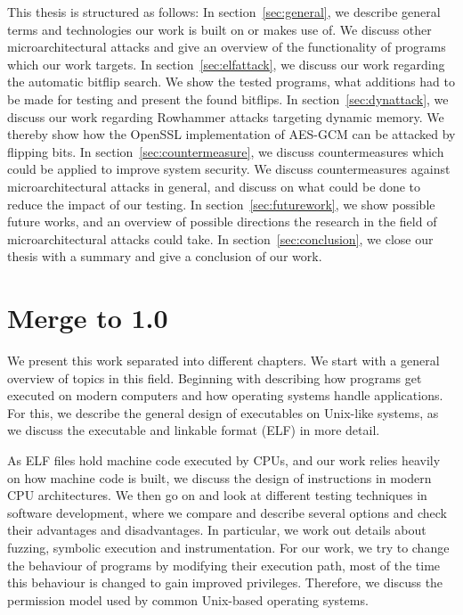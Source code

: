 This thesis is structured as follows: In section~\ref{sec:general}, we describe
general terms and technologies our work is built on or makes use of. We discuss
other microarchitectural attacks and give an overview of the functionality of
programs which our work targets. In section~\ref{sec:elfattack}, we discuss our
work regarding the automatic bitflip search. We show the tested programs, what
additions had to be made for testing and present the found bitflips. In
section~\ref{sec:dynattack}, we discuss our work regarding Rowhammer attacks
targeting dynamic memory. We thereby show how the OpenSSL implementation of
AES-GCM can be attacked by flipping bits. In section~\ref{sec:countermeasure},
we discuss countermeasures which could be applied to improve system security. We
discuss countermeasures against microarchitectural attacks in general, and
discuss on what could be done to reduce the impact of our testing. In
section~\ref{sec:futurework}, we show possible future works, and an overview of
possible directions the research in the field of microarchitectural attacks
could take. In section~\ref{sec:conclusion}, we close our thesis with a summary
and give a conclusion of our work.

\section{Merge to 1.0}

We present this work separated into different chapters. We start with a general
overview of topics in this field. Beginning with describing how programs get
executed on modern computers and how operating systems handle applications. For
this, we describe the general design of executables on Unix-like systems, as we
discuss the executable and linkable format (ELF) in more detail.

As ELF files hold machine code executed by CPUs, and our work relies heavily on
how machine code is built, we discuss the design of instructions in modern
CPU architectures.  We then go on and look at different testing techniques in
software development, where we compare and describe several options and check
their advantages and disadvantages. In particular, we work out details about
fuzzing, symbolic execution and instrumentation. For our work, we try to change
the behaviour of programs by modifying their execution path, most of the time
this behaviour is changed to gain improved privileges. Therefore, we discuss the
permission model used by common Unix-based operating systems.

